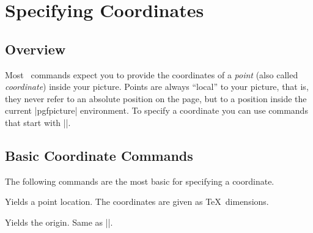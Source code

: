 %
%
%


\section[base-points]{Specifying Coordinates}
\label{section-points}

\subsection{Overview}

Most \pgfname\ commands expect you to provide the coordinates of a \emph{point}
(also called \emph{coordinate}) inside your picture. Points are always
``local'' to your picture, that is, they never refer to an absolute position on
the page, but to a position inside the current |{pgfpicture}| environment. To
specify a coordinate you can use commands that start with |\pgfpoint|.


\subsection{Basic Coordinate Commands}

The following commands are the most basic  for specifying a coordinate.

\begin{command}{\pgfpoint{}}
    Yields a point location. The coordinates are given as \TeX\ dimensions.
\begin{codeexample}[]
\end{codeexample}
\end{command}

\begin{command}{\pgfpointorigin}
    Yields the origin. Same as |\pgfpoint{0pt}{0pt}|.
\end{command}

